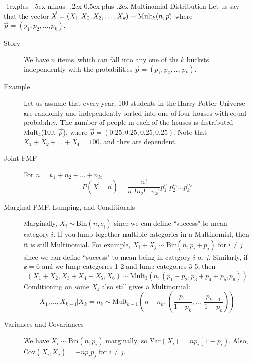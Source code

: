 \documentclass[10pt,landscape]{article}
\makeatletter
\newcommand{\var}{\textrm{Var}}
\newcommand{\cov}{\textrm{Cov}}
\newcommand{\Bin}{\textrm{Bin}}
\newcommand{\Mult}{\textrm{Mult}}
\renewcommand{\subsection}{\@startsection{subsection}{2}{0mm}%
{-1explus -.5ex minus -.2ex}%
{0.5ex plus .2ex}%
{\normalfont\normalsize\bfseries}}
\makeatother
\begin{document}
\begin{multicols*}{3}
        \subsection{Multinomial Distribution}
        Let us say that the vector $\vec{X} = (X_1, X_2, X_3, \dots, X_k) \sim \textnormal{Mult}_k(n, \vec{p})$  where $\vec{p} = (p_1, p_2, \dots, p_k)$.
        \begin{description}
            \item[Story]  We have $n$ items, which can fall into any one of the $k$ buckets independently with the probabilities $\vec{p} = (p_1, p_2, \dots, p_k)$.
            \item[Example]  Let us assume that every year, 100 students in the Harry Potter Universe are randomly and independently sorted into one of four houses with equal probability. The number of people in each of the houses is distributed $\Mult_4$(100, $\vec{p}$), where $\vec{p} = (0.25, 0.25, 0.25, 0.25)$.
            Note that $X_1 + X_2 + \dots + X_4 = 100$, and they are dependent.
            \item[Joint PMF]  For $n = n_1 + n_2 + \dots + n_k$,
            \[P(\vec{X} = \vec{n}) =  \frac{n!}{n_1!n_2!\dots n_k!}p_1^{n_1}p_2^{n_2}\dots p_k^{n_k}\]
            \item[Marginal PMF, Lumping, and Conditionals]
            Marginally, $X_i \sim \Bin(n,p_i)$ since we can define ``success" to mean category $i$. If you lump together multiple categories in a Multinomial, then it is still Multinomial. For example, $X_i + X_j \sim \Bin(n, p_i + p_j)$ for $i \neq j$ since we can define ``success" to mean being in category $i$ or $j$. Similarly, if $k=6$ and we lump categories 1-2 and lump categories 3-5, then
            \[ (X_1+X_2,X_3+X_4+X_5,X_6) \sim \Mult_3(n, (p_1+p_2, p_3 + p_4+p_5,p_6))\]
            Conditioning on some $X_j$ also still gives a Multinomial:
            \[X_1, \dots, X_{k-1} | X_k = n_k \sim \Mult_{k-1}\left(n - n_k, \left(\frac{p_1}{1 - p_k}, \dots, \frac{p_{k-1}}{1 - p_k}\right)\right)\]
            \item[Variances and Covariances]  We have  $X_i \sim \Bin(n, p_i)$ marginally, so $\var(X_i) = np_i(1-p_i)$. Also, $\cov(X_i, X_j) = -np_ip_j$ for $i \neq j$.
        \end{description}



\end{multicols*}
\end{document}
